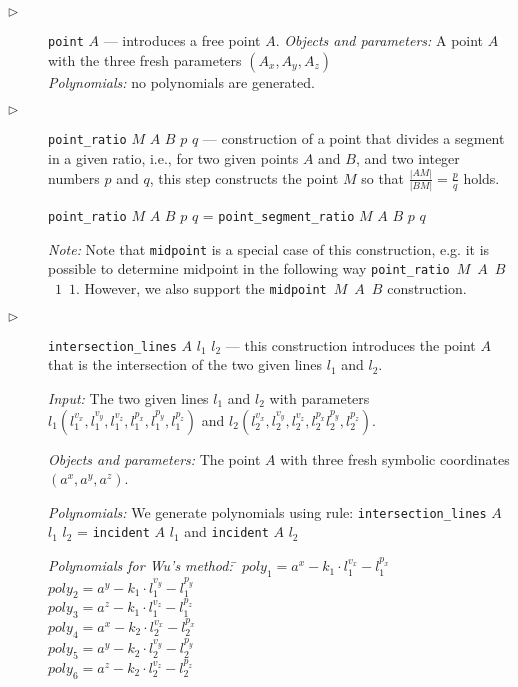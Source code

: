 \documentclass[final,1p,times,authoryear]{elsarticle}
\begin{document}
\begin{description}

\item[$\triangleright$] {\tt point} $A$ --- introduces a free point $A$.
  {\em Objects and parameters:} A point $A$ with the three fresh parameters
  $(A_x, A_y, A_z)$ \\
  {\em Polynomials:} no polynomials are generated. \\

\item[$\triangleright$] {\tt point\_ratio} $M$ $A$ $B$ $p$ $q$ ---
  construction of a point that divides a segment in a given ratio,
  i.e., for two given points $A$ and $B$, and two integer numbers $p$
  and $q$, this step constructs the point $M$ so that
  $\frac{|AM|}{|BM|} = \frac{p}{q}$ holds.

  {\tt point\_ratio} $M$ $A$ $B$ $p$ $q$ = {\tt point\_segment\_ratio} $M$ $A$ $B$ $p$ $q$

{\em Note:} Note that {\tt midpoint} is a special case of this
construction, e.g. it is possible to determine midpoint in the
following way \mbox{{\tt point\_ratio} $M$ $A$ $B$ $1$ $1$}. However,
we also support the \mbox{{\tt midpoint} $M$ $A$ $B$} construction.

\item[$\triangleright$] {\tt intersection\_lines} $A$ $l_1$ $l_2$ ---
  this construction introduces the point $A$ that is
  the intersection of the two given lines $l_1$ and $l_2$.

  {\em Input:} The two given lines $l_1$ and $l_2$ with parameters
  $l_1(l_1^{v_x}, l_1^{v_y}, l_1^{v_z}, l_1^{p_x}, l_1^{p_y},
  l_1^{p_z})$ and $l_2(l_2^{v_x}, l_2^{v_y}, l_2^{v_z}, l_2^{p_x}
  l_2^{p_y}, l_2^{p_z})$.

  {\em Objects and parameters:} The point $A$ with three fresh
  symbolic coordinates $(a^x, a^y, a^z)$.

  {\em Polynomials:} We generate polynomials using rule:
  {\tt intersection\_lines} $A$ $l_1$ $l_2$ = {\tt incident} $A$ $l_1$ and {\tt incident} $A$ $l_2$


\begin{tabbing}
{\em Polynomials for Wu's method:} \= $poly_1 = a^x - k_1\cdot l_1^{v_x} - l_1^{p_x}$ \\
                   \> $poly_2 = a^y - k_1\cdot l_1^{v_y} - l_1^{p_y}$ \\
                   \> $poly_3 = a^z - k_1\cdot l_1^{v_z} - l_1^{p_z}$ \\
                   \> $poly_4 = a^x - k_2\cdot l_2^{v_x} - l_2^{p_x}$ \\
                   \> $poly_5 = a^y - k_2\cdot l_2^{v_y} - l_2^{p_y}$ \\
                   \> $poly_6 = a^z - k_2\cdot l_2^{v_z} - l_2^{p_z}$
\end{tabbing}


\end{description}
\end{document}
